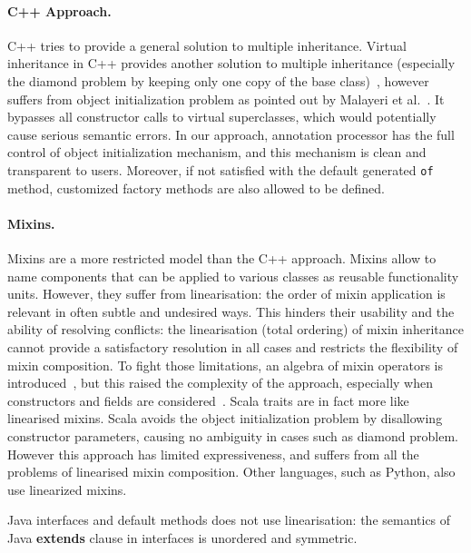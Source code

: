 \paragraph{C++ Approach.}
C++ tries to provide a general solution to multiple inheritance. Virtual
inheritance in C++ provides another solution to multiple inheritance (especially
the diamond problem by keeping only one copy of the base
class)~\cite{ellis1990annotated}, however suffers from object initialization
problem as pointed out by Malayeri et al.~\cite{malayeri2009cz}. It bypasses all
constructor calls to virtual superclasses, which would potentially cause serious
semantic errors. In our approach, \mixin annotation processor has the full
control of object initialization mechanism, and this mechanism is clean and
transparent to users. Moreover, if not satisfied with the default generated
\texttt{of} method, customized factory methods are also allowed to be defined.

\paragraph{Mixins.}
Mixins are a more restricted model than the C++ approach. Mixins allow to name
components that can be applied to various classes as reusable functionality
units. However, they suffer from linearisation: the order of mixin application
is relevant in often subtle and undesired ways. This hinders their usability
and the ability of resolving conflicts: the linearisation (total ordering) of
mixin inheritance cannot provide a satisfactory resolution in all cases and
restricts the flexibility of mixin composition. To fight those limitations, an
algebra of mixin operators is introduced~\cite{ancona2002calculus}, but this
raised the complexity of the approach, especially when constructors and fields
are considered~\cite{marco09FJigsaw}. Scala traits are in fact more like linearised mixins.
Scala avoids the object initialization
problem by disallowing constructor parameters, causing no ambiguity in cases
such as diamond problem. However this approach has limited expressiveness, and
suffers from all the problems of linearised mixin composition. Other languages, such as 
Python, also use linearized mixins.
\begin{comment}
Python also offers multiple inheritance via linearised mixins. Indeed in python any class is implicitly a mixin, and mixin composition informally expressed as\\*
\Q@ class A use B,C {...new methods...}@\\*
can be expressed in python as \\*
\Q@ class Aux: ...new methods...@\\*
\Q@ class A(B,C,Aux): pass@ 
\end{comment}
\noindent Java interfaces and default methods does not use
linearisation: the semantics of Java \textbf{extends} clause in
interfaces is unordered and symmetric.

